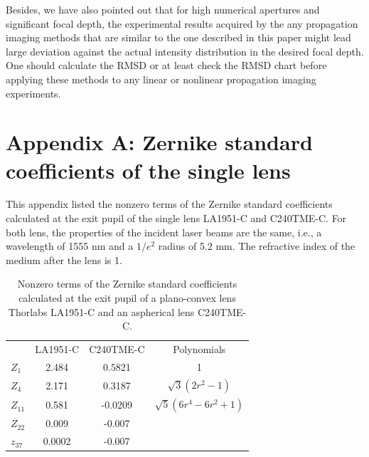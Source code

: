 \documentclass[9pt,twocolumn,twoside]{osajnl}
\begin{document}
Besides, we have also pointed out that for high numerical apertures and significant focal depth, the experimental results acquired by the any propagation imaging methods that are similar to the one described in this paper might lead large deviation against the actual intensity distribution in the desired focal depth. One should calculate the RMSD or at least check the RMSD chart before applying these methods to any linear or nonlinear propagation imaging experiments. 


\appendix
\section*{Appendix A: Zernike standard coefficients of the single lens}
\setcounter{table}{0}
\renewcommand{\thetable}{A\arabic{table}}
This appendix listed the nonzero terms of the Zernike standard coefficients calculated at the exit pupil of the single lens LA1951-C and C240TME-C. For both lens, the properties of the incident laser beams are the same, i.e., a wavelength of 1555 nm and a $1/e^2$ radius of 5.2 mm. The refractive index of the medium after the lens is 1.
\begin{table}[h!]
	\centering
	\begin{tabular}[c]{|l|c|c|c|}
		\hline
		\rowcolor{lightgray}
		\rowcolor{gray}
		 & LA1951-C & C240TME-C & Polynomials\\
		$Z_1$ & 2.484 & 0.5821 & 1 \\
		\rowcolor{lightgray}
		$Z_4$ & 2.171 & 0.3187 & $\sqrt{3}(2r^2-1)$ \\
		$Z_{11}$ & 0.581 & -0.0209 & $\sqrt{5}(6r^4-6r^2+1)$ \\
		\rowcolor{lightgray}
		$Z_{22}$ & 0.009 & -0.007 & \vtop{\hbox{\strut $\sqrt{7}(20r^6-30r^4$}\hbox{\strut $+12r^2-1)$}}\\
		$z_{37}$ & 0.0002 & -0.007 & \vtop{\hbox{\strut $\sqrt{9}(70r^8-140r^6$}\hbox{\strut $+90r^4-20r^2+1)$}}\\
		\hline
	\end{tabular}	
	\caption{Nonzero terms of the Zernike standard coefficients calculated at the exit pupil of a plano-convex lens Thorlabs LA1951-C and an aspherical lens C240TME-C.}\label{tab:A1}
\end{table}



\end{document}
